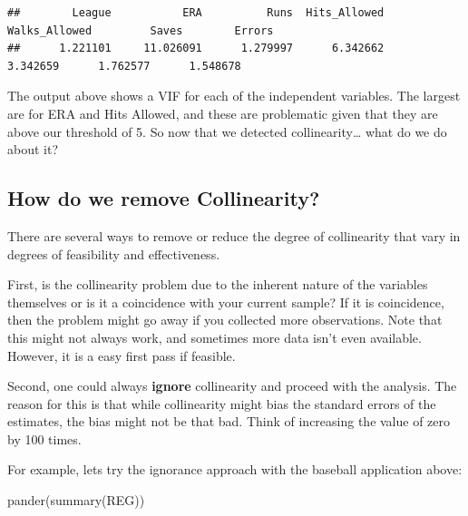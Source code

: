 \documentclass[
]{book}
\newenvironment{Shaded}{\begin{snugshade}}{\end{snugshade}}
\newcommand{\FunctionTok}[1]{\textcolor[rgb]{0.00,0.00,0.00}{#1}}
\newcommand{\NormalTok}[1]{#1}
\begin{document}
\begin{verbatim}
##        League           ERA          Runs  Hits_Allowed Walks_Allowed         Saves        Errors 
##      1.221101     11.026091      1.279997      6.342662      3.342659      1.762577      1.548678
\end{verbatim}

The output above shows a VIF for each of the independent variables. The largest are for ERA and Hits Allowed, and these are problematic given that they are above our threshold of 5.
So now that we detected collinearity\ldots{} what do we do about it?

\hypertarget{how-do-we-remove-collinearity}{%
\subsection{How do we remove Collinearity?}\label{how-do-we-remove-collinearity}}

There are several ways to remove or reduce the degree of collinearity that vary in degrees of feasibility and effectiveness.

First, is the collinearity problem due to the inherent nature of the variables themselves or is it a coincidence with your current sample? If it is coincidence, then the problem might go away if you collected more observations. Note that this might not always work, and sometimes more data isn't even available. However, it is a easy first pass if feasible.

Second, one could always \textbf{ignore} collinearity and proceed with the analysis. The reason for this is that while collinearity might bias the standard errors of the estimates, the bias might not be that bad. Think of increasing the value of zero by 100 times.

For example, lets try the ignorance approach with the baseball application above:

\begin{Shaded}
\begin{Highlighting}[]
\FunctionTok{pander}\NormalTok{(}\FunctionTok{summary}\NormalTok{(REG))}
\end{Highlighting}
\end{Shaded}
\end{document}
